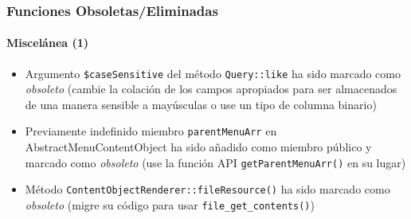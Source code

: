 \begin{frame}[fragile]
	\frametitle{Funciones Obsoletas/Eliminadas}
	\framesubtitle{Miscelánea (1)}


	\begin{itemize}

		\item Argumento \texttt{\$caseSensitive} del método \texttt{Query::like}
			ha sido marcado como \textit{obsoleto}\newline
			\smaller
				(cambie la colación de los campos apropiados para ser almacenados de una manera sensible a mayúsculas
				o use un tipo de columna binario)
			\normalsize

		\item Previamente indefinido miembro \texttt{parentMenuArr} en AbstractMenuContentObject
			ha sido añadido como miembro público y marcado como \textit{obsoleto}\newline
			\smaller
				(use la función API \texttt{getParentMenuArr()} en su lugar)
			\normalsize

		\item Método \texttt{ContentObjectRenderer::fileResource()}
			ha sido marcado como \textit{obsoleto}\newline
			\smaller
				(migre su código para usar \texttt{file\_get\_contents()})
			\normalsize

	\end{itemize}

\end{frame}





